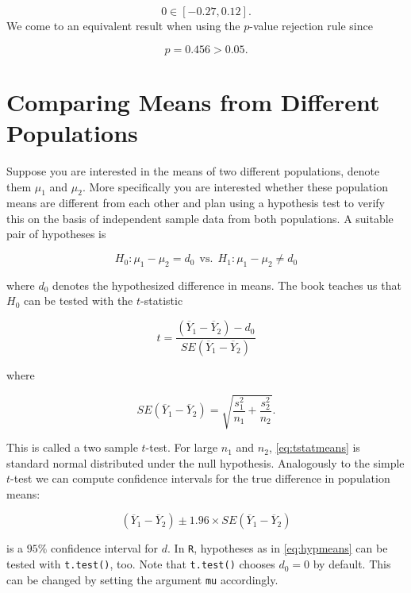\documentclass[]{book}
\theoremstyle{definition}
\theoremstyle{definition}
\theoremstyle{definition}
\theoremstyle{remark}
\begin{document}
\[ 0 \in \left[-0.27,0.12\right]. \] We come to an equivalent result
when using the \(p\)-value rejection rule since

\[ p = 0.456 > 0.05. \]

\section{Comparing Means from Different
Populations}\label{comparing-means-from-different-populations}

Suppose you are interested in the means of two different populations,
denote them \(\mu_1\) and \(\mu_2\). More specifically you are
interested whether these population means are different from each other
and plan using a hypothesis test to verify this on the basis of
independent sample data from both populations. A suitable pair of
hypotheses is

\begin{equation}
H_0: \mu_1 - \mu_2 = d_0 \ \ \text{vs.} \ \ H_1: \mu_1 - \mu_2 \neq d_0 \label{eq:hypmeans}
\end{equation}

where \(d_0\) denotes the hypothesized difference in means. The book
teaches us that \(H_0\) can be tested with the \(t\)-statistic

\begin{equation}
t=\frac{(\overline{Y}_1 - \overline{Y}_2) - d_0}{SE(\overline{Y}_1 - \overline{Y}_2)} \label{eq:tstatmeans}
\end{equation}

where

\begin{equation}
SE(\overline{Y}_1 - \overline{Y}_2) = \sqrt{\frac{s_1^2}{n_1} + \frac{s_2^2}{n_2}}.
\end{equation}

This is called a two sample \(t\)-test. For large \(n_1\) and \(n_2\),
\eqref{eq:tstatmeans} is standard normal distributed under the null
hypothesis. Analogously to the simple \(t\)-test we can compute
confidence intervals for the true difference in population means:

\[ (\overline{Y}_1 - \overline{Y}_2) \pm 1.96 \times SE(\overline{Y}_1 - \overline{Y}_2) \]

is a \(95\%\) confidence interval for \(d\). In \texttt{R}, hypotheses
as in \eqref{eq:hypmeans} can be tested with \texttt{t.test()}, too. Note
that \texttt{t.test()} chooses \(d_0 = 0\) by default. This can be
changed by setting the argument \texttt{mu} accordingly.
\end{document}
